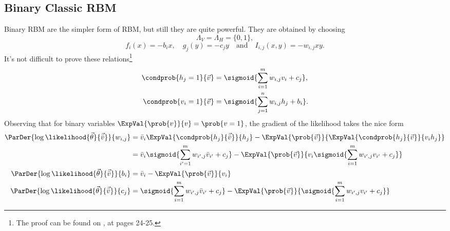   \subsection{Binary Classic RBM} \label{subsec:binary-classic-RBM}
  Binary RBM are the simpler form of RBM, but still they are quite powerful.
  They are obtained by choosing
  \[\Lambda_V = \Lambda_H = \{0,1\},\]
  \[
    f_i(x) = -b_ix, \quad g_j(y) = -c_jy  \quad\text{and}\quad I_{i,j}(x,y)=-w_{i,j}xy.
  \]
  It's not difficult to prove these relations\footnote{The proof can be found on
  \cite{fischer2012introduction}, at pages 24-25.}
  \begin{align}
    \label{eq:prob-one-hidden-given-visible}
    \condprob{h_j=1}{\vec{v}} &= \sigmoid{\sum_{i=1}^m w_{i,j}v_i+c_j},\\
    \label{eq:prob-one-visible-given-hidden}
    \condprob{v_i=1}{\vec{v}} &= \sigmoid{\sum_{j=1}^n w_{i,j}h_j+b_i}.
  \end{align}
  Observing that for binary variables \(\ExpVal{\prob{v}}{v} = \prob{v=1}\), the gradient of
  the likelihood takes the nice form
  \begin{align}
    \nonumber
    \ParDer{\log\likelihood{\vec{\theta}}{\vec{\bar{v}}}}{w_{i,j}}
      &= \bar{v}_i\ExpVal{\condprob{h_j}{\vec{\bar{v}}}}{h_j} 
         -\ExpVal{\prob{\vec{v}}}{\ExpVal{\condprob{h_j}{\vec{v}}}{v_ih_j}} \\
      \label{eq:logL-gradient-w-RBM}
      &= \bar{v}_i \sigmoid{\sum_{i'=1}^m w_{i',j}\bar{v}_{i'}+c_j}
         -\ExpVal{\prob{\vec{v}}}{v_i \sigmoid{\sum_{i=1}^m w_{i',j}v_{i'}+c_j}} \\
    \ParDer{\log\likelihood{\vec{\theta}}{\vec{\bar{v}}}}{b_i}
      &= \bar{v}_i -\ExpVal{\prob{\vec{v}}}{v_i} \\
    \ParDer{\log\likelihood{\vec{\theta}}{\vec{\bar{v}}}}{c_j}
      &= \sigmoid{\sum_{i=1}^m w_{i',j}\bar{v}_{i'}+c_j}
         -\ExpVal{\prob{\vec{v}}}{\sigmoid{\sum_{i=1}^m w_{i',j}v_{i'}+c_j}}
  \end{align}
